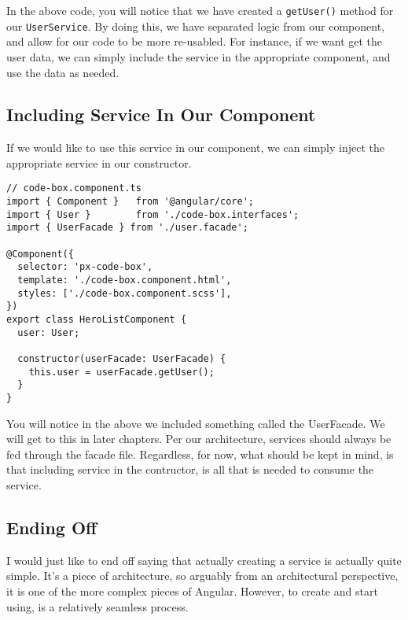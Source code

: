 In the above code, you will notice that we have created a \lstinline{getUser()}
method for our \lstinline{UserService}. By doing this, we have separated logic 
from our component, and allow for our code to be more re-usabled. For instance, 
if we want get the user data, we can simply include the service in the 
appropriate component, and use the data as needed. 

\subsection{Including Service In Our Component}
If we would like to use this service in our component, we can simply inject 
the appropriate service in our constructor. 

\begin{lstlisting}
// code-box.component.ts
import { Component }   from '@angular/core';
import { User }        from './code-box.interfaces';
import { UserFacade } from './user.facade';

@Component({
  selector: 'px-code-box',
  template: './code-box.component.html',
  styles: ['./code-box.component.scss'],
})
export class HeroListComponent {
  user: User;

  constructor(userFacade: UserFacade) {
    this.user = userFacade.getUser();
  }
}
\end{lstlisting}

You will notice in the above we included something called the UserFacade. We will 
get to this in later chapters. Per our architecture, services should always be 
fed through the facade file. Regardless, for now, what should be kept in mind, 
is that including service in the contructor, is all that is needed to consume 
the service. 

\subsection{Ending Off}
I would just like to end off saying that actually creating a service is 
actually quite simple. It's a piece of architecture, so arguably from an 
architectural perspective, it is one of the more complex pieces of Angular. 
However, to create and start using, is a relatively seamless process.